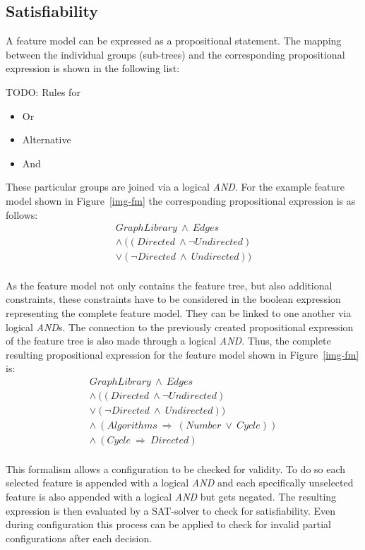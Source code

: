 \subsection{Satisfiability}
A feature model can be expressed as a propositional statement. The mapping between the individual groups (sub-trees) and the corresponding propositional expression is shown in the following list:

{\color{red}TODO: Rules for
\begin{itemize}
	\item Or
	\item Alternative
	\item And
\end{itemize}
}
These particular groups are joined via a logical \textit{AND}. For the example feature model shown in Figure~\ref{img-fm} the corresponding propositional expression is as follows:
\begin{equation}
\begin{split}
	GraphLibrary\ \wedge\ Edges\\
	\wedge\ ((Directed\ \wedge \neg Undirected)\\
	\vee (\neg Directed\ \wedge\ Undirected))
\end{split}
\end{equation}\\

As the feature model not only contains the feature tree, but also additional constraints, these constraints have to be considered in the boolean expression representing the complete feature model. They can be linked to one another via logical \textit{AND}s. The connection to the previously created propositional expression of the feature tree is also made through a logical \textit{AND}. Thus, the complete resulting propositional expression for the feature model shown in Figure~\ref{img-fm} is:
\begin{equation}
\begin{split}
	GraphLibrary\ \wedge\ Edges\\
	\wedge\ ((Directed\ \wedge \neg Undirected)\\
	\vee (\neg Directed\ \wedge\ Undirected))\\
	\wedge\ (Algorithms\ \Rightarrow\ (Number\ \vee\ Cycle))\\
	\wedge\ (Cycle\ \Rightarrow\ Directed)
\end{split}
\end{equation}\\
This formalism allows a configuration to be checked for validity. To do so each selected feature is appended with a logical \textit{AND} and each specifically unselected feature is also appended with a logical \textit{AND} but gets negated. The resulting expression is then evaluated by a SAT-solver to check for satisfiability. Even during configuration this process can be applied to check for invalid partial configurations after each decision.
